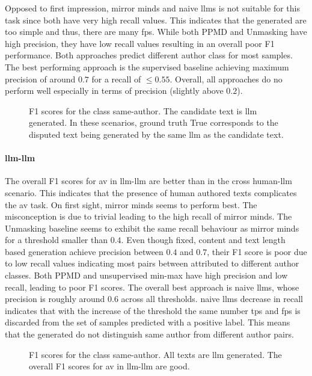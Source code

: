 Opposed to first impression, mirror minds and naive \acp{llm} is not suitable for this task since both have very high recall values.
This indicates that the generated \imps{} are too simple and thus, there are many \acp{fp}.
While both PPMD and Unmasking have high precision, they have low recall values resulting in an overall poor F1 performance. 
Both approaches predict different author class for most samples.
The best performing approach is the supervised baseline achieving maximum precision of around $0.7$ for a recall of $\le 0.55$.
Overall, all approaches do no perform well especially in terms of precision (slightly above $0.2$).


\begin{figure}[b]
  \centering
  
  \caption{F1 scores for the class same-author. 
The candidate text is \ac{llm} generated.
In these scenarios, ground truth True corresponds to the disputed text being generated by the same \ac{llm} as the candidate text.
}
  \label{fig:llm_av_prec}
\end{figure}



\paragraph{\ac{llm}-\ac{llm}}
The overall F1 scores for \ac{av} in \ac{llm}-\ac{llm} are better than in the cross human-\ac{llm} scenario.
This indicates that the presence of human authored texts complicates the \ac{av} task.
On first sight, mirror minds seems to perform best.
The misconception is due to trivial \imps{} leading to the high recall of mirror minds.
The Unmasking baseline seems to exhibit the same recall behaviour as mirror minds for a threshold smaller than $0.4$.
Even though fixed, content and text length based \imp{} generation achieve precision between $0.4$ and $0.7$, their F1 score is poor due to low recall values indicating most pairs between attributed to different author classes.
Both PPMD and unsupervised min-max have high precision and low recall, leading to poor F1 scores.
The overall best approach is \ac{naive} \acp{llm}, whose precision is roughly around $0.6$ across all thresholds.
\ac{naive} \acp{llm} decrease in recall indicates that with the increase of the threshold the same number \acp{tp} and \acp{fp} is discarded from the set of samples predicted with a positive label.
This means that the generated \imps{} do not distinguish same author from different author pairs.


  \begin{figure}[b]
    \centering
    
    \caption{F1 scores for the class same-author.
  All texts are \ac{llm} generated.
  The overall F1 scores for \ac{av} in \ac{llm}-\ac{llm} are good.
  }
    \label{fig:llm-llm_f1}
  \end{figure}

